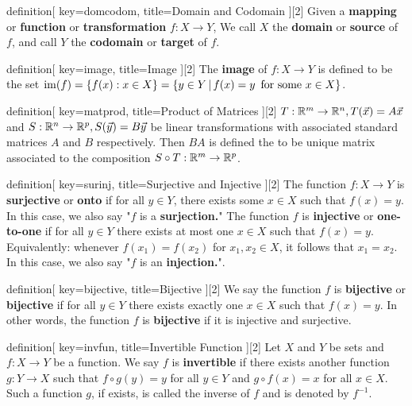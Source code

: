 \begin{SaveConcept}{definition}[
		key=domcodom,
		title={Domain and Codomain}
	][2]
	Given a {\bf mapping} or {\bf function} or {\bf transformation} $f:X \longrightarrow Y$,  We call $X$ the {\bf domain} or {\bf source}  of $f$, and call $Y$ the {\bf codomain} or {\bf target} of $f$.
\end{SaveConcept}


\begin{SaveConcept}{definition}[
		key=image,
		title={Image}
	][2]
	The {\bf image} of $f:X\to Y$ is defined to be the set $\operatorname{im}(f) = \{ f(x): x \in X\}=\{ y \in Y \, | \, f(x) = y \, \text{ for  some } x\in X\}$.
\end{SaveConcept}

\begin{SaveConcept}{definition}[
		key=matprod,
		title={Product of Matrices}
	][2]
        $T:\mathbb{R}^m\rightarrow\mathbb{R}^n, T(\vec x)=A\vec x$ and $S:\mathbb{R}^n\rightarrow\mathbb{R}^p, S(\vec y)=B\vec y$ be linear transformations with associated standard matrices $A$ and $B$ respectively. Then   $BA$ is defined the to be unique matrix associated to the composition $S\circ T: \mathbb{R}^m\rightarrow \mathbb{R}^p$.
\end{SaveConcept}




\begin{SaveConcept}{definition}[
		key=surinj,
		title={Surjective and Injective}
	][2]
	The function  $f:X\to Y$ is {\bf surjective} or {\bf onto} if  for all $y \in Y$, there exists some $x\in X$ such that $f(x) = y$. In this case, we also say "$f$ is a  {\bf surjection.}"
        The function  $f$ is {\bf injective} or {\bf one-to-one} if for all $y \in Y$ there exists at most one $x \in X$ such that $f(x) = y$. Equivalently: whenever $f(x_1) = f(x_2)$ for $x_1, x_2 \in X$, it follows that $x_1 = x_2$. In this case, we also say "$f$ is an {\bf injection.}".
\end{SaveConcept}


\begin{SaveConcept}{definition}[
		key=bijective,
		title={Bijective}
	][2]
        We say the function $f$ is {\bf bijective} or {\bf bijective} if for all $y \in Y$ there exists exactly one $x \in X$ such that $f(x) = y$.	In other words, the function $f$ is {\bf bijective} if it is injective and surjective.
\end{SaveConcept}


\begin{SaveConcept}{definition}[
		key=invfun,
		title={Invertible Function}
	][2]
        Let $X$ and $Y$ be sets and $f:X \to Y$ be a function. We say $f$ is \textbf{invertible} if there exists another function $g:Y\to X$ such that $f\circ g (y)=y$ for all $y\in Y$ and $g\circ f(x)=x$ for all $x\in X.$ Such a function $g$, if exists, is called the inverse of $f$ and is denoted by $f^{-1}$.
\end{SaveConcept}


